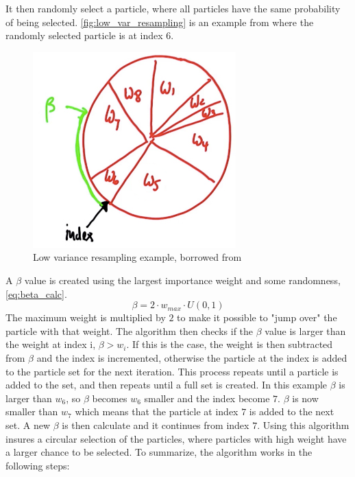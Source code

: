 \documentclass[Main]{subfiles}
\begin{document}
It then randomly select a particle, where all particles have the same probability of being selected.
\autoref{fig:low_var_resampling} is an example from \citep{Thrun2002} where the randomly selected particle is at index 6.
\begin{figure}[H]
	\centering
	\includegraphics[width=0.3\linewidth]{./Figures/low_var_resampling.png}
	\caption{Low variance resampling example, borrowed from \citep{Thrun2002}}
	\label{fig:low_var_resampling}
\end{figure}\noindent
A $\beta$ value is created using the largest importance weight and some randomness, \autoref{eq:beta_calc}.
\begin{equation}
\label{eq:beta_calc}
	\beta = 2 \cdot w_{max} \cdot U(0,1)
\end{equation}
The maximum weight is multiplied by $2$ to make it possible to "jump over" the particle with that weight.
The algorithm then checks if the $\beta$ value is larger than the weight at index i, $\beta > w_i$.
If this is the case, the weight is then subtracted from $\beta$ and the index is incremented, otherwise the particle at the index is added to the particle set for the next iteration. 
This process repeats until a particle is added to the set, and then repeats until a full set is created.
In this example $\beta$ is larger than $w_6$, so $\beta$ becomes $w_6$ smaller and the index become $7$.
$\beta$ is now smaller than $w_7$ which means that the particle at index $7$ is added to the next set. 
A new $\beta$ is then calculate and it continues from index $7$.
Using this algorithm insures a circular selection of the particles, where particles with high weight have a larger chance to be selected.
To summarize, the algorithm works in the following steps:
\end{document}
